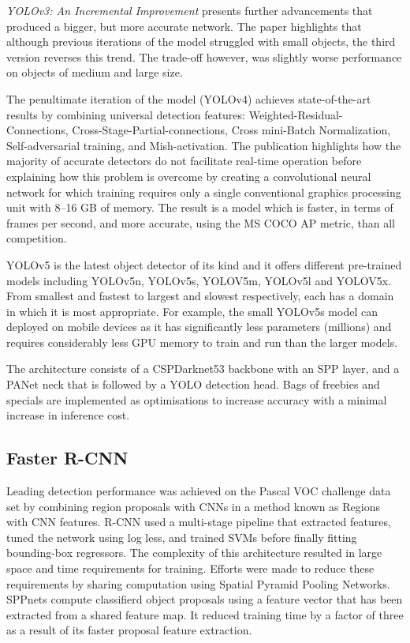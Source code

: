 \documentclass{thesis}
\begin{document}
\textit{YOLOv3: An Incremental Improvement} presents further advancements that produced a bigger, but more accurate network. The paper highlights that although previous iterations of the model struggled with small objects, the third version reverses this trend. The trade-off however, was slightly worse performance on objects of medium and large size\cite{yolo3}.

The penultimate iteration of the model (YOLOv4) achieves state-of-the-art results by combining universal detection features: Weighted-Residual-Connections, Cross-Stage-Partial-connections, Cross mini-Batch Normalization, Self-adversarial training, and Mish-activation\cite{yolov4}. The publication highlights how the majority of accurate detectors do not facilitate real-time operation before explaining how this problem is overcome by creating a convolutional neural network for which training requires only a single conventional graphics processing unit with 8--16 GB of memory. The result is a model which is faster, in terms of frames per second, and more accurate, using the MS COCO AP metric, than all competition.

YOLOv5 is the latest object detector of its kind and it offers different pre-trained models including YOLOv5n, YOLOv5s, YOLOV5m, YOLOv5l and YOLOV5x. From smallest and fastest to largest and slowest respectively, each has a domain in which it is most appropriate. For example, the small YOLOv5s model can deployed on mobile devices as it has significantly less parameters (millions) and requires considerably less GPU memory to train and run than the larger models\cite{yolov5}.

The architecture consists of a CSPDarknet53 backbone with an SPP layer, and a PANet neck that is followed by a YOLO detection head\cite{yolov1}. Bags of freebies and specials are implemented as optimisations to increase accuracy with a minimal increase in inference cost\cite{yolov4}.

\subsection{Faster R-CNN}

Leading detection performance was achieved on the Pascal VOC challenge data set by combining region proposals with CNNs in a method known as Regions with CNN features. R-CNN used a multi-stage pipeline that extracted features, tuned the network using log less, and trained SVMs before finally fitting bounding-box regressors\cite{rcnn}. The complexity of this architecture resulted in large space and time requirements for training. Efforts were made to reduce these requirements by sharing computation using Spatial Pyramid Pooling Networks. SPPnets compute classifierd object proposals using a feature vector that has been extracted from a shared feature map. It reduced training time by a factor of three as a result of its faster proposal feature extraction\cite{he2015spatial}.
\end{document}
